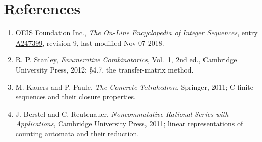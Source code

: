 \documentclass[11pt]{article}
\theoremstyle{definition}
\begin{document}
\section{References}

\begin{enumerate}

\item OEIS Foundation Inc., \emph{The On-Line Encyclopedia of Integer Sequences}, entry \href{https://oeis.org/A247399}{A247399}, revision 9, last modified Nov 07 2018.

\item R. P. Stanley, \emph{Enumerative Combinatorics}, Vol.~1, 2nd ed., Cambridge University Press, 2012; \S4.7, the transfer-matrix method.

\item M. Kauers and P. Paule, \emph{The Concrete Tetrahedron}, Springer, 2011; C-finite sequences and their closure properties.

\item J. Berstel and C. Reutenauer, \emph{Noncommutative Rational Series with Applications}, Cambridge University Press, 2011; linear representations of counting automata and their reduction.

\end{enumerate}
\end{document}
